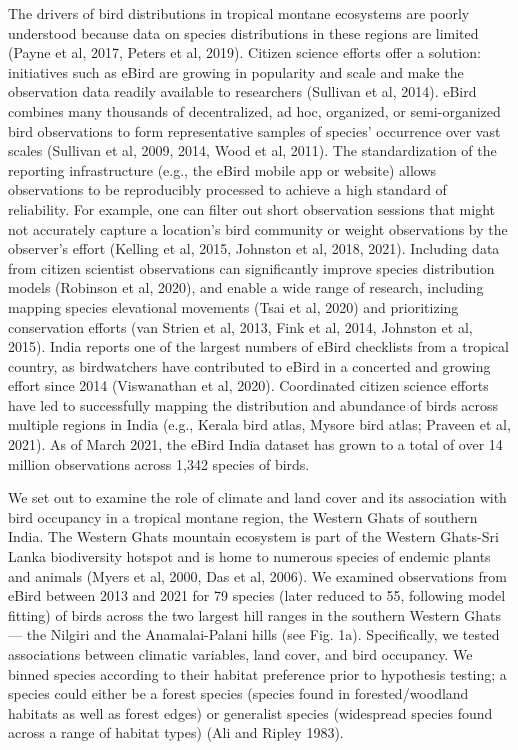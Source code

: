 The drivers of bird distributions in tropical montane ecosystems are poorly understood because data on species distributions in these regions are limited (Payne et al, 2017, Peters et al, 2019).
Citizen science efforts offer a solution: initiatives such as eBird are growing in popularity and scale and make the observation data readily available to researchers (Sullivan et al, 2014).
eBird combines many thousands of decentralized, ad hoc, organized, or semi-organized bird observations to form representative samples of species' occurrence over vast scales (Sullivan et al, 2009, 2014, Wood et al, 2011).
The standardization of the reporting infrastructure (e.g., the eBird mobile app or website) allows observations to be reproducibly processed to achieve a high standard of reliability.
For example, one can filter out short observation sessions that might not accurately capture a location's bird community or weight observations by the observer's effort (Kelling et al, 2015, Johnston et al, 2018, 2021).
Including data from citizen scientist observations can significantly improve species distribution models (Robinson et al, 2020), and enable a wide range of research, including mapping species elevational movements (Tsai et al, 2020) and prioritizing conservation efforts (van Strien et al, 2013, Fink et al, 2014, Johnston et al, 2015).
India reports one of the largest numbers of eBird checklists from a tropical country, as birdwatchers have contributed to eBird in a concerted and growing effort since 2014 (Viswanathan et al, 2020).
Coordinated citizen science efforts have led to successfully mapping the distribution and abundance of birds across multiple regions in India (e.g., Kerala bird atlas, Mysore bird atlas; Praveen et al, 2021).
As of March 2021, the eBird India dataset has grown to a total of over 14 million observations across 1,342 species of birds.

We set out to examine the role of climate and land cover and its association with bird occupancy in a tropical montane region, the Western Ghats of southern India.
The Western Ghats mountain ecosystem is part of the Western Ghats-Sri Lanka biodiversity hotspot and is home to numerous species of endemic plants and animals (Myers et al, 2000, Das et al, 2006).
We examined observations from eBird between 2013 and 2021 for 79 species (later reduced to 55, following model fitting) of birds across the two largest hill ranges in the southern Western Ghats --- the Nilgiri and the Anamalai-Palani hills (see Fig.
1a).
Specifically, we tested associations between climatic variables, land cover, and bird occupancy.
We binned species according to their habitat preference prior to hypothesis testing; a species could either be a forest species (species found in forested/woodland habitats as well as forest edges) or generalist species (widespread species found across a range of habitat types) (Ali and Ripley 1983).

